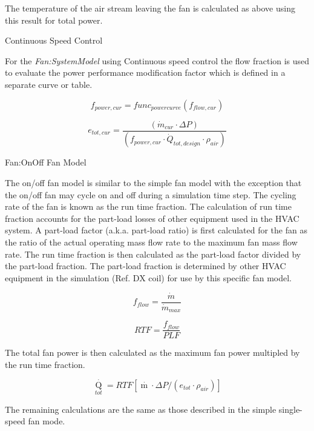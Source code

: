 The temperature of the air stream leaving the fan is calculated as above using this result for total power. 

Continuous Speed Control

For the \emph{Fan:SystemModel} using Continuous speed control the flow fraction is used to evaluate the power performance modification factor which is defined in a separate curve or table.  

\begin{equation}
{f_{power,cur}} =  {func_{power curve}}({f_{flow,cur}})
\end{equation}

\begin{equation}
{e_{tot,cur}} = \frac {( { \dot m_{cur} \cdot \Delta P  } )}{( {f_{power,cur}} \cdot { \dot Q_{tot, design} \cdot \rho_{air}})}
\end{equation}


Fan:OnOff Fan Model


The on/off fan model is similar to the simple fan model with the exception that the on/off fan may cycle on and off during a simulation time step. The cycling rate of the fan is known as the run time fraction. The calculation of run time fraction accounts for the part-load losses of other equipment used in the HVAC system. A part-load factor (a.k.a. part-load ratio) is first calculated for the fan as the ratio of the actual operating mass flow rate to the maximum fan mass flow rate. The run time fraction is then calculated as the part-load factor divided by the part-load fraction. The part-load fraction is determined by other HVAC equipment in the simulation (Ref. DX coil) for use by this specific fan model.

\begin{equation}
  f_{flow} = \frac{\dot{m}}{\dot{m}_{max}}
\end{equation}

\begin{equation}
  RTF = \frac{f_{flow}}{PLF}
\end{equation}

The total fan power is then calculated as the maximum fan power multipled by the run time fraction.

\begin{equation}
{\mathop Q\limits^\cdot_{tot}} = RTF\left[ {\mathop m\limits^\cdot  \cdot \Delta P/\left( {{e_{tot}}\cdot {\rho_{air}}} \right)} \right]
\end{equation}

The remaining calculations are the same as those described in the simple single-speed fan mode.

